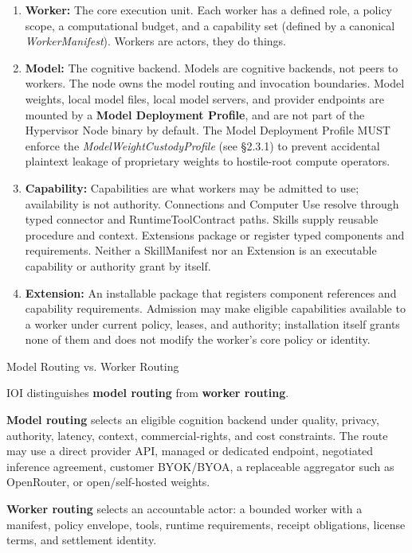 \documentclass[
  11pt,
]{article}
\providecommand{\tightlist}{%
  \setlength{\itemsep}{0pt}\setlength{\parskip}{0pt}}
\begin{document}
\begin{enumerate}
\def\labelenumi{\arabic{enumi}.}
\tightlist
\item
  \textbf{Worker:} The core execution unit. Each worker has a defined
  role, a policy scope, a computational budget, and a capability set
  (defined by a canonical \emph{WorkerManifest}). Workers are actors,
  they do things.
\item
  \textbf{Model:} The cognitive backend. Models are cognitive backends,
  not peers to workers. The node owns the model routing and invocation
  boundaries. Model weights, local model files, local model servers, and
  provider endpoints are mounted by a \textbf{Model Deployment Profile},
  and are not part of the Hypervisor Node binary by default. The Model
  Deployment Profile MUST enforce the \emph{ModelWeightCustodyProfile}
  (see §2.3.1) to prevent accidental plaintext leakage of proprietary
  weights to hostile-root compute operators.
\item
  \textbf{Capability:} Capabilities are what workers may be admitted to use;
  availability is not authority. Connections and Computer Use resolve through
  typed connector and RuntimeToolContract paths. Skills supply reusable
  procedure and context. Extensions package or register typed components and
  requirements. Neither a SkillManifest nor an Extension is an executable
  capability or authority grant by itself.
\item
  \textbf{Extension:} An installable package that registers component
  references and capability requirements. Admission may make eligible
  capabilities available to a worker under current policy, leases, and
  authority; installation itself grants none of them and does not modify the
  worker's core policy or identity.
\end{enumerate}

Model Routing vs. Worker Routing

IOI distinguishes \textbf{model routing} from \textbf{worker routing}.

\textbf{Model routing} selects an eligible cognition backend under
quality, privacy, authority, latency, context, commercial-rights, and
cost constraints. The route may use a direct provider API, managed or
dedicated endpoint, negotiated inference agreement, customer BYOK/BYOA,
a replaceable aggregator such as OpenRouter, or open/self-hosted weights.

\textbf{Worker routing} selects an accountable actor: a bounded worker
with a manifest, policy envelope, tools, runtime requirements, receipt
obligations, license terms, and settlement identity.
\end{document}
